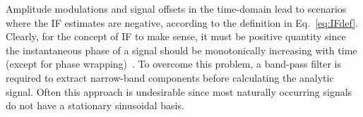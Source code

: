 \documentclass[a4paper]{IEEEtran}
\begin{document}

Amplitude modulations and signal offsets in the time-domain lead to scenarios where the IF estimates are negative, according to the definition in Eq.~\ref{eq:IFdef}. Clearly, for the concept of IF to make sense, it must be positive quantity since the instantaneous phase of a signal should be monotonically increasing with time (except for phase wrapping)~\cite{Huang1998}. To overcome this problem, a band-pass filter is required to extract narrow-band components before calculating the analytic signal. Often this approach is undesirable since most naturally occurring signals do not have a stationary sinusoidal basis. 
\end{document}
